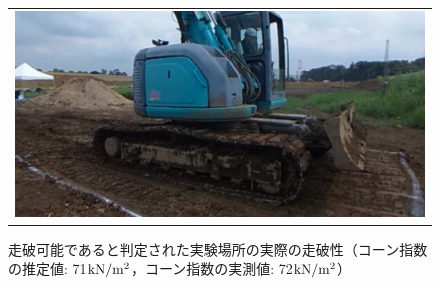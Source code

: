 \begin{figure}[b]
      \begin{center}
            \begin{tabular}{c}

            \begin{minipage}[b]{\linewidth}
            \centering
            \includegraphics[width=12cm]{./ch5_ConeIndexEstimation/Fig/trafficability_coneindex_461_233_compressed.pdf}
            \setlength{\captionmargin}{50pt} %
            \caption{走破可能であると判定された実験場所の実際の走破性\protect\linebreak（コーン指数の推定値: 71${\rm kN/m^2}$，コーン指数の実測値: 72${\rm kN/m^2}$）}
            \label{fig:validationsoil_trafficability_possible_coneindex_461_233}
            \vspace{3cm}
            \end{minipage}

            \end{tabular}
      \end{center}
\end{figure}

